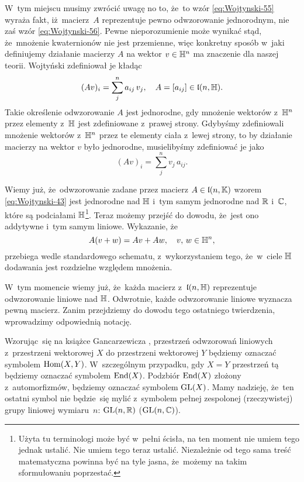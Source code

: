 \documentclass[a4paper,11pt]{article}
\begin{document}
W~tym miejscu musimy zwrócić uwagę no to, że~to wzór \eqref{eq:Wojtynski-55}
wyraża fakt, iż~macierz~$A$ reprezentuje pewno odwzorowanie jednorodnym,
nie zaś wzór \eqref{eq:Wojtynski-56}. Pewne nieporozumienie może wynikać
stąd, że~mnożenie kwaternionów nie jest przemienne, więc konkretny sposób
w~jaki definiujemy działanie macierzy $A$ na wektor $v \in \mathbb{H}^{ n }$ ma
znaczenie dla naszej teorii. Wojtyński zdefiniował je kładąc
\begin{equation}
  \label{eq:Wojtynski-58}
  ( A v )_{ i } = \sum_{ j }^{ n } a_{ i j } \, v_{ j }, \quad
  A = [ a_{ ij } ] \in \mathfrak{l}( n, \mathbb{H} ).
\end{equation}
Takie określenie odwzorowanie $A$ jest jednorodne, gdy mnożenie wektorów
z~$\mathbb{H}^{ n }$ przez elementy z~$\mathbb{H}$ jest zdefiniowane z~prawej strony.
Gdybyśmy zdefiniowali mnożenie wektorów z~$\mathbb{H}^{ n }$ przez te elementy
ciała z~lewej strony, to by działanie macierzy na wektor $v$ było
jednorodne, musielibyśmy zdefiniować je jako
\begin{equation}
  \label{eq:Wojtynski-59}
  ( A v )_{ i } = \sum_{ j }^{ n } v_{ j } \, a_{ i j }.
\end{equation}

Wiemy już, że~odwzorowanie zadane przez macierz $A \in \mathfrak{l}( n, \mathbb{K} )$
wzorem \eqref{eq:Wojtynski-43} jest jednorodne nad $\mathbb{H}$ i~tym samym
jednorodne nad $\mathbb{R}$ i~$\mathbb{C}$, które są podciałami $\mathbb{H}$\footnote{Użyta
  tu terminologi może być w~pełni ścisła, na ten moment nie umiem tego
  jednak ustalić. Nie umiem tego teraz ustalić. Niezależnie od tego sama
  treść matematyczna powinna być na tyle jasna, że~możemy na takim
  sformułowaniu poprzestać.}. Teraz możemy przejść do dowodu, że~jest ono
addytywne i~tym samym liniowe. Wykazanie, że
\begin{equation}
  \label{eq:Wojtynski-60}
  A ( v + w ) = A v + A w, \quad v, \, w \in \mathbb{H}^{ n },
\end{equation}
przebiega wedle standardowego schematu, z~wykorzystaniem tego, że~w~ciele
$\mathbb{H}$ dodawania jest rozdzielne względem mnożenia.

W~tym momencie wiemy już, że~każda macierz z~$\mathfrak{l}( n, \mathbb{H} )$
reprezentuje odwzorowanie liniowe nad $\mathbb{H}$. Odwrotnie, każde odwzorowanie
liniowe wyznacza pewną macierz. Zanim przejdziemy do dowodu tego ostatniego twierdzenia, wprowadzimy odpowiednią notację.

Wzorując~się na książce Gancarzewicza
\cite{GancarzewiczAlgebraLiniowa2004}, przestrzeń odwzorowań liniowych
z~przestrzeni wektorowej $X$ do przestrzeni wektorowej $Y$ będziemy
oznaczać symbolem $\mathrm{Hom}( X, Y )$. W~szczególnym przypadku, gdy $X = Y$
przestrzeń tą będziemy oznaczać symbolem $\mathrm{End}( X )$. Podzbiór $\mathrm{End}( X )$
złożony z~automorfizmów, będziemy oznaczać symbolem $\mathrm{GL}( X )$. Mamy
nadzieję, że~ten ostatni symbol nie będzie~się mylić z~symbolem pełnej
zespolonej (rzeczywistej) grupy liniowej wymiaru~$n$: $\mathrm{GL}( n, \mathbb{R} )$
($\mathrm{GL}( n, \mathbb{C} )$).
\end{document}
